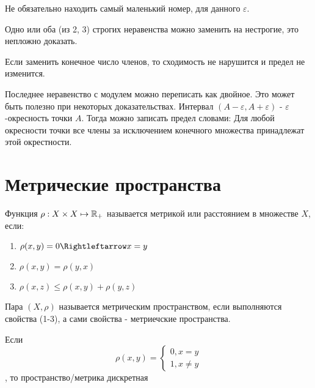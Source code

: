 \documentclass[12pt, a4paper]{article}
\begin{document}
  \begin{note}
  Не обязательно находить самый маленький номер, для данного $\varepsilon$.
  \end{note}

  \begin{note}
  Одно или оба (из 2, 3) строгих неравенства можно заменить на нестрогие, это непложно доказать.
  \end{note}

  \begin{note}
  Если заменить конечное число членов, то сходимость не нарушится и предел не изменится.
  \end{note}

  \begin{note}
  Последнее неравенство с модулем можно переписать как двойное. Это может быть полезно при некоторых доказательствах.
  Интервал $(A - \varepsilon, A + \varepsilon)$ - $\varepsilon$-окресность точки $A$.
  Тогда можно записать предел словами:
  Для любой окресности точки все члены за исключением конечного множества принадлежат этой окрестности.
  \end{note}


  \section{Метрические пространства}

  \begin{definition}
  Функция $\rho: X \times X \mapsto {\mathbb{R}}_{+}$ называется метрикой или расстоянием в множестве $X$, если:

  \begin{enumerate}
    \item $\rho (x, y) = 0 \Rightleftarrow x = y$
    \item  $\rho (x, y) = \rho (y, x)$
    \item $\rho (x, z) \leqslant \rho (x, y) + \rho (y, z)$
  \end{enumerate}
  \end{definition}

  \begin{definition}

  Пара $(X, \rho)$ называется метрическим пространством, если выполняются свойства (1-3), а сами свойства - метриечские пространства.
  \end{definition}

  \begin{example}
  Если \begin{equation}
    \rho(x, y) = \begin{cases}
      0, x = y \\
      1, x \neq y
    \end{cases}
  \end{equation}, то пространство/метрика дискретная
  \end{example}
\end{document}
